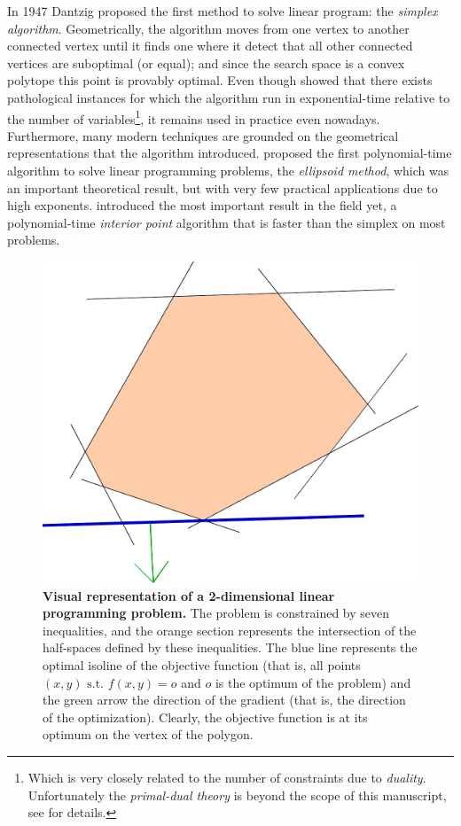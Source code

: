 	In 1947 Dantzig proposed the first method to solve linear program: the \emph{simplex algorithm}.
	Geometrically, the algorithm moves from one vertex to another connected vertex until it finds one where it detect that all other connected vertices are suboptimal (or equal); and since the search space is a convex polytope this point is provably optimal.
	Even though \textcite{klee1970good} showed that there exists pathological instances for which the algorithm run in exponential-time relative to the number of variables\footnote{Which is very closely related to the number of constraints due to \emph{duality}. Unfortunately the \emph{primal-dual theory} is beyond the scope of this manuscript, see \parencite{papadimitriou1982combinatorial} for details.}, it remains used in practice even nowadays.
	Furthermore, many modern techniques are grounded on the geometrical representations that the algorithm introduced.
	\Textcite{khachiyan1980polynomial} proposed the first polynomial-time algorithm to solve linear programming problems, the \emph{ellipsoid method}, which was an important theoretical result, but with very few practical applications due to high exponents.
	\Textcite{karmarkar1984new} introduced the most important result in the field yet, a polynomial-time \emph{interior point} algorithm that is faster than the simplex on most problems.

	\begin{figure}[t]
		\centering
		\includegraphics[width=0.65\columnwidth]{img/linopt.pdf}
		\caption[Visual representation of a 2d linear programming problem]{\textbf{Visual representation of a 2-dimensional linear programming problem.}
			The problem is constrained by seven inequalities, and the orange section represents the intersection of the half-spaces defined by these inequalities. The blue line represents the optimal isoline of the objective function (that is, all points $(x,y)\text{ s.t. }f(x,y) = o$ and $o$ is the optimum of the problem) and the green arrow the direction of the gradient (that is, the direction of the optimization). Clearly, the objective function is at its optimum on the vertex of the polygon.
		}
		\label{fig:linearprog}
	\end{figure}

